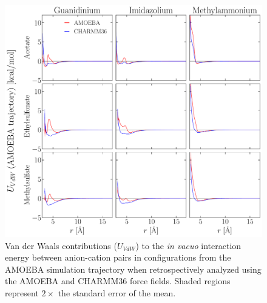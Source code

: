 \documentclass[journal=jacsat,articletitle=true,manuscript=suppinfo,layout=onecolumn]{achemso}
\begin{document}
    \begin{figure}[H]
    \begin{center}
        \includegraphics[width=1\columnwidth]{images/cross_ff_analysis_vdw_traj_generated_by_amoeba.pdf}
        \caption{Van der Waals contributions ($U_{VdW}$) to the \emph{in vacuo} interaction energy between anion-cation pairs in configurations from the AMOEBA simulation trajectory when retrospectively analyzed using the AMOEBA and CHARMM36 force fields. Shaded regions represent $2\times$ the standard error of the mean.}
        \label{fig:cross_ff_vdw}
    \end{center}
    \end{figure}
\end{document}
